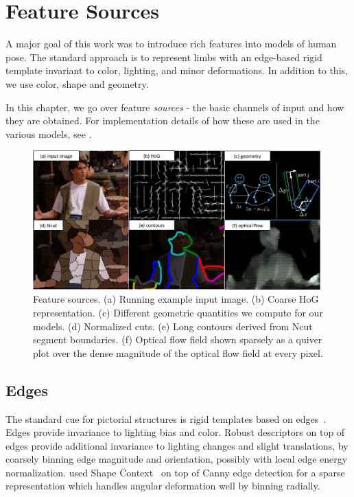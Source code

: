 \chapter{Feature Sources}\label{sec:features}

A major goal of this work was to introduce rich features into models of human 
pose.  The standard approach is to represent limbs with an edge-based rigid 
template invariant to color, lighting, and minor deformations. In addition to 
this, we use color, shape and geometry. 

In this chapter, we go over feature {\em sources} - the basic channels of input 
and how they are obtained.  For implementation details of how these are used in 
the various models, see .

\begin{figure}[tb]
\begin{center}
\includegraphics[width=1.05\textwidth]{figs/feature-sources.pdf}
\caption[Feature sources.]{Feature sources. (a) Running example input image.  
(b) Coarse HoG representation. (c) Different geometric quantities we compute 
for our models. (d) Normalized cuts.  (e) Long contours derived from Ncut 
segment boundaries. (f) Optical flow field shown sparsely as a quiver plot over 
the dense magnitude of the optical flow field at every pixel.}
\label{fig:feature-sources}
\end{center}
\end{figure}



\section{Edges}\label{sec:edges}
The standard cue for pictorial structures is rigid templates based on 
edges~\citep{ferrari08,eichner09,andriluka09,ddtran,devacrf,deva2011}.  Edges 
provide invariance to lighting bias and color.  Robust descriptors on top of 
edges provide additional invariance to lighting changes and slight 
translations, by coarsely binning edge magnitude and orientation, possibly with 
local edge energy normalization.  \citet{andriluka09} used Shape 
Context~\citep{belongie2001} on top of Canny edge detection for a sparse 
representation which handles angular deformation well by binning radially.  

